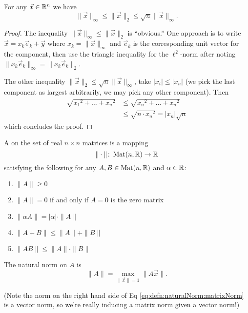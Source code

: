 \begin{thm}
For any $\vec{x}\in\mathbb{R}^n$ we have
\begin{equation}
\|\vec{x}\|_{\infty}\leq\|\vec{x}\|_{2}\leq\sqrt{n}\|\vec{x}\|_{\infty}.
\end{equation}
\end{thm}
\begin{proof}
The inequality $\|\vec{x}\|_{\infty}\leq\|\vec{x}\|_{2}$ is ``obvious.''
One approach is to write $\vec{x}=x_{k}\vec{e}_{k}+\vec{y}$ where
$x_{k}=\|\vec{x}\|_{\infty}$ and $\vec{e}_{k}$ is the corresponding unit
vector for the component, then use the triangle inequality for the
$\ell^{2}$-norm after noting $\|x_{k}\vec{e}_{k}\|_{\infty}=\|x_{k}\vec{e}_{k}\|_{2}$. 

The other inequality $\|\vec{x}\|_{2}\leq\sqrt{n}\|\vec{x}\|_{\infty}$,
take $|x_{i}|\leq|x_{n}|$ (we pick the last component as largest
arbitrarily, we may pick any other component). Then
\begin{equation}
\begin{split}
\sqrt{{x_{1}}^{2}+\dots+{x_{n}}^{2}}
&\leq\sqrt{{x_{n}}^{2}+\dots+{x_{n}}^{2}}\\
&\leq\sqrt{n\cdot{x_{n}}^{2}}=|x_{n}|\sqrt{n}
\end{split}
\end{equation}
which concludes the proof.
\end{proof}

\begin{defn}
A  on the set of real $n\times n$ matrices is a
mapping
\begin{equation}
\|\cdot\|\colon\mathop{\mathrm{Mat}}\nolimits(n,\mathbb{R})\to\mathbb{R}
\end{equation}
satisfying the following for any $A,B\in\mathop{\mathrm{Mat}}\nolimits(n,\mathbb{R})$ and $\alpha\in\mathbb{R}$:
\begin{enumerate}
\item $\|A\|\geq0$
\item $\|A\|=0$ if and only if $A=0$ is the zero matrix
\item $\|\alpha A\|=|\alpha|\cdot\|A\|$
\item $\|A+B\|\leq\|A\|+\|B\|$
\item $\|AB\|\leq\|A\|\cdot\|B\|$
\end{enumerate}
\end{defn}
\begin{thm}
The natural norm on $A$ is 
\begin{equation}\label{eq:defn:naturalNorm:matrixNorm}
\|A\|=\max_{\|\vec{x}\|=1}\|A\vec{x}\|.
\end{equation}
\end{thm}
(Note the norm on the right hand side of Eq
\eqref{eq:defn:naturalNorm:matrixNorm} is a vector norm, so we're really
inducing a matrix norm given a vector norm!)

